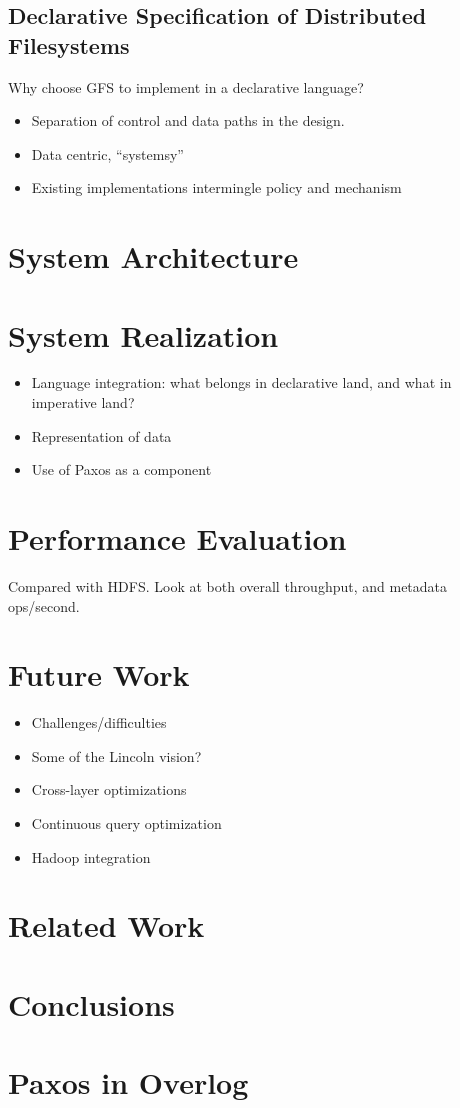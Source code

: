 \documentclass{article}
\begin{document}
\subsection{Declarative Specification of Distributed Filesystems}
Why choose GFS to implement in a declarative language?
\begin{itemize}
\item
  Separation of control and data paths in the design.

\item
  Data centric, ``systemsy''

\item
  Existing implementations intermingle policy and mechanism
\end{itemize}

\section{System Architecture}

\section{System Realization}
\begin{itemize}
\item
  Language integration: what belongs in declarative land, and what in
  imperative land?

\item
  Representation of data

\item
  Use of Paxos as a component
\end{itemize}

\section{Performance Evaluation}
Compared with HDFS. Look at both overall throughput, and metadata ops/second.

\section{Future Work}
\begin{itemize}
\item
  Challenges/difficulties

\item
  Some of the Lincoln vision?

\item
  Cross-layer optimizations

\item
  Continuous query optimization

\item
  Hadoop integration
\end{itemize}

\section{Related Work}

\section{Conclusions}



\appendix
\section{Paxos in Overlog}
\end{document}
